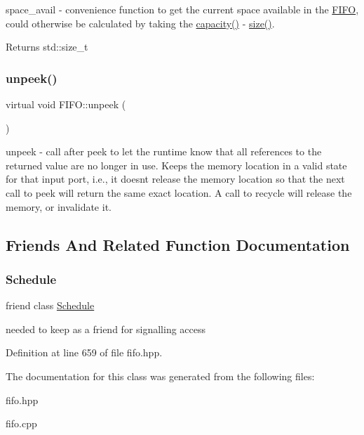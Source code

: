 space\+\_\+avail -\/ convenience function to get the current space available in the \hyperlink{class_f_i_f_o}{F\+I\+FO}, could otherwise be calculated by taking the \hyperlink{class_f_i_f_o_a64565d7156f6796ff14c3033387043b1}{capacity()} -\/ \hyperlink{class_f_i_f_o_ae80b8555fc249168560c67cd0a13e574}{size()}. \begin{DoxyReturn}{Returns}
std\+::size\+\_\+t 
\end{DoxyReturn}
\hypertarget{class_f_i_f_o_aa0cbb6c4a5b8783af38c6deb1a6f651e}{}\label{class_f_i_f_o_aa0cbb6c4a5b8783af38c6deb1a6f651e} 
\subsubsection{\texorpdfstring{unpeek()}{unpeek()}}
{\footnotesize\ttfamily virtual void F\+I\+F\+O\+::unpeek (\begin{DoxyParamCaption}{ }\end{DoxyParamCaption})\hspace{0.3cm}{\ttfamily [pure virtual]}}

unpeek -\/ call after peek to let the runtime know that all references to the returned value are no longer in use. Keeps the memory location in a valid state for that input port, i.\+e., it doesn\textquotesingle{}t release the memory location so that the next call to peek will return the same exact location. A call to recycle will release the memory, or invalidate it. 

\subsection{Friends And Related Function Documentation}
\hypertarget{class_f_i_f_o_aae5808dc2e987bf17ef42196457a654d}{}\label{class_f_i_f_o_aae5808dc2e987bf17ef42196457a654d} 
\subsubsection{\texorpdfstring{Schedule}{Schedule}}
{\footnotesize\ttfamily friend class \hyperlink{class_schedule}{Schedule}\hspace{0.3cm}{\ttfamily [friend]}}

needed to keep as a friend for signalling access 

Definition at line 659 of file fifo.\+hpp.



The documentation for this class was generated from the following files\+:\begin{DoxyCompactItemize}
\item 
fifo.\+hpp\item 
fifo.\+cpp\end{DoxyCompactItemize}
